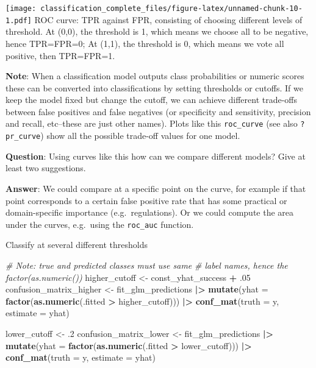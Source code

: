 \documentclass[
]{article}
\newenvironment{Shaded}{\begin{snugshade}}{\end{snugshade}}
\newcommand{\AttributeTok}[1]{\textcolor[rgb]{0.13,0.29,0.53}{#1}}
\newcommand{\CommentTok}[1]{\textcolor[rgb]{0.56,0.35,0.01}{\textit{#1}}}
\newcommand{\DecValTok}[1]{\textcolor[rgb]{0.00,0.00,0.81}{#1}}
\newcommand{\FunctionTok}[1]{\textcolor[rgb]{0.13,0.29,0.53}{\textbf{#1}}}
\newcommand{\NormalTok}[1]{#1}
\newcommand{\OtherTok}[1]{\textcolor[rgb]{0.56,0.35,0.01}{#1}}
\newcommand{\SpecialCharTok}[1]{\textcolor[rgb]{0.81,0.36,0.00}{\textbf{#1}}}
\begin{document}
\texttt{[image: classification\_complete\_files/figure-latex/unnamed-chunk-10-1.pdf]}
ROC curve: TPR against FPR, consisting of choosing different levels of
threshold. At (0,0), the threshold is 1, which means we choose all to be
negative, hence TPR=FPR=0; At (1,1), the threshold is 0, which means we
vote all positive, then TPR=FPR=1.

\textbf{Note}: When a classification model outputs class probabilities
or numeric scores these can be converted into classifications by setting
thresholds or cutoffs. If we keep the model fixed but change the cutoff,
we can achieve different trade-offs between false positives and false
negatives (or specificity and sensitivity, precision and recall,
etc--these are just other names). Plots like this \texttt{roc\_curve}
(see also \texttt{?pr\_curve}) show all the possible trade-off values
for one model.

\textbf{Question}: Using curves like this how can we compare different
models? Give at least two suggestions.

\textbf{Answer}: We could compare at a specific point on the curve, for
example if that point corresponds to a certain false positive rate that
has some practical or domain-specific importance (e.g.~regulations). Or
we could compute the area under the curves, e.g.~using the
\texttt{roc\_auc} function.

Classify at several different thresholds

\begin{Shaded}
\begin{Highlighting}[]
\CommentTok{\# Note: true and predicted classes must use same}
\CommentTok{\# label names, hence the factor(as.numeric()) }
\NormalTok{higher\_cutoff }\OtherTok{\textless{}{-}}\NormalTok{ const\_yhat\_success }\SpecialCharTok{+}\NormalTok{ .}\DecValTok{05}
\NormalTok{confusion\_matrix\_higher }\OtherTok{\textless{}{-}}
\NormalTok{  fit\_glm\_predictions }\SpecialCharTok{|\textgreater{}}
  \FunctionTok{mutate}\NormalTok{(}\AttributeTok{yhat =} \FunctionTok{factor}\NormalTok{(}\FunctionTok{as.numeric}\NormalTok{(.fitted }\SpecialCharTok{\textgreater{}}\NormalTok{ higher\_cutoff))) }\SpecialCharTok{|\textgreater{}}
  \FunctionTok{conf\_mat}\NormalTok{(}\AttributeTok{truth =}\NormalTok{ y, }\AttributeTok{estimate =}\NormalTok{ yhat)}
\end{Highlighting}
\end{Shaded}

\begin{Shaded}
\begin{Highlighting}[]
\NormalTok{lower\_cutoff }\OtherTok{\textless{}{-}}\NormalTok{ .}\DecValTok{2}
\NormalTok{confusion\_matrix\_lower }\OtherTok{\textless{}{-}}
\NormalTok{  fit\_glm\_predictions }\SpecialCharTok{|\textgreater{}}
  \FunctionTok{mutate}\NormalTok{(}\AttributeTok{yhat =} \FunctionTok{factor}\NormalTok{(}\FunctionTok{as.numeric}\NormalTok{(.fitted }\SpecialCharTok{\textgreater{}}\NormalTok{ lower\_cutoff))) }\SpecialCharTok{|\textgreater{}}
  \FunctionTok{conf\_mat}\NormalTok{(}\AttributeTok{truth =}\NormalTok{ y, }\AttributeTok{estimate =}\NormalTok{ yhat)}
\end{Highlighting}
\end{Shaded}
\end{document}
